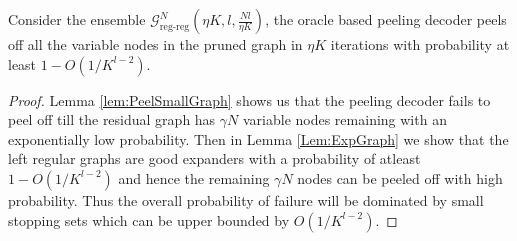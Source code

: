 \begin{theorem}\label{Thm:PeelingOptimal}
Consider the ensemble $\mathcal{G}^{N}_{\text{reg-reg}}(\eta K,l,\frac{Nl}{\eta K})$, the oracle based peeling decoder peels off all the variable nodes in the pruned graph in $\eta K$ iterations with probability at least $1-O\left(1/K^{l-2}\right)$.
\end{theorem}
\begin{proof}
 Lemma \ref{lem:PeelSmallGraph} shows us that the peeling decoder fails to peel off till the residual graph has $\gamma N$ variable nodes remaining with an exponentially low probability. Then in Lemma \ref{Lem:ExpGraph} we show that the left regular graphs are good expanders with a probability of atleast $1-O(1/K^{l-2})$ and hence the remaining $\gamma N$ nodes can be peeled off with high probability. Thus the overall probability of failure will be dominated by small stopping sets which can be upper bounded by $O(1/K^{l-2})$.
\end{proof}
\vspace{3ex}

